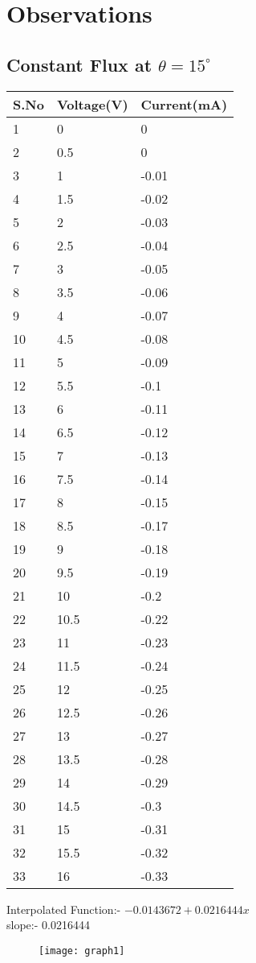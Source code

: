 \documentclass[
	letterpaper, %
	10pt, %
]{CSUniSchoolLabReport}
\begin{document}
\section{Observations}
\subsection{Constant Flux at \(\theta = 15^{\circ}\) }
\begin{center}
	\begin{tabular}{ | m{1cm} | m{3cm}| m{3cm} | } 
	\hline
	S.No & Voltage(V) & Current(mA) \\
	\hline
	1&0&0\\
	2&0.5&0\\
	3&1&-0.01\\
	4&1.5&-0.02\\
	5&2&-0.03\\
	6&2.5&-0.04\\
	7&3&-0.05\\
	8&3.5&-0.06\\
	9&4&-0.07\\
	10&4.5&-0.08\\
	11&5&-0.09\\
	12&5.5&-0.1\\
	13&6&-0.11\\
	14&6.5&-0.12\\
	15&7&-0.13\\
	16&7.5&-0.14\\
	17&8&-0.15\\
	18&8.5&-0.17\\
	19&9&-0.18\\
	20&9.5&-0.19\\
	21&10&-0.2\\
	22&10.5&-0.22\\
	23&11&-0.23\\
	24&11.5&-0.24\\
	25&12&-0.25\\
	26&12.5&-0.26\\
	27&13&-0.27\\
	28&13.5&-0.28\\
	29&14&-0.29\\
	30&14.5&-0.3\\
	31&15&-0.31\\
	32&15.5&-0.32\\
	33&16&-0.33\\
	\hline

	\end{tabular}
	\end{center}
	Interpolated Function:- \(-0.0143672 + 0.0216444 x\) \\
	slope:- 0.0216444 
	\begin{figure}[H] %
		\centering %
		\texttt{[image: graph1]} %
		\caption{}
	\end{figure}
\end{document}
